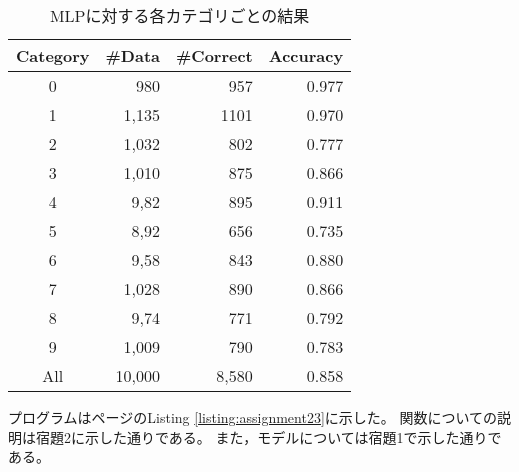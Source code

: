 \documentclass[class=jsarticle, crop=false, dvipdfmx, fleqn]{standalone}
\begin{document}
\begin{table}[H]
	\centering
	\caption{MLPに対する各カテゴリごとの結果}
	\begin{tabular}{crrr}
		Category & {\#}Data & {\#}Correct & Accuracy \\ \hline
        0 & 980 & 957 & 0.977 \\
        1 & 1,135 & 1101 & 0.970 \\
        2 & 1,032 & 802 & 0.777 \\
        3 & 1,010 & 875 & 0.866 \\
        4 & 9,82 & 895 & 0.911 \\
        5 & 8,92 & 656 & 0.735 \\
        6 & 9,58 & 843 & 0.880 \\
        7 & 1,028 & 890 & 0.866 \\
        8 & 9,74 & 771 & 0.792 \\
        9 & 1,009 & 790 & 0.783 \\
        All & 10,000 & 8,580 & 0.858 \\
	\end{tabular}
	\label{tab:result_MLP}
\end{table}

プログラムは\pageref{listing:assignment23}ページのListing \ref{listing:assignment23}に示した。
関数についての説明は宿題2に示した通りである。
また，モデルについては宿題1で示した通りである。
\end{document}
